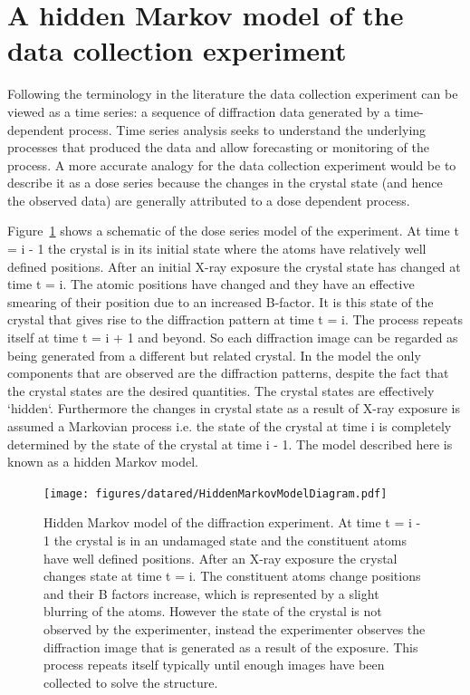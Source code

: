 \section{A hidden Markov model of the data collection experiment}
\label{sec:A hidden Markov model of the data collection experiment}
Following the terminology in the literature the data collection experiment can be viewed as a time series: a sequence of diffraction data generated by a time-dependent process.
Time series analysis seeks to understand the underlying processes that produced the data and allow forecasting or monitoring of the process.
A more accurate analogy for the data collection experiment would be to describe it as a dose series because the changes in the crystal state (and hence the observed data) are generally attributed to a dose dependent process.

Figure~\ref{fig:Hidden Markov Model diagram} shows a schematic of the dose series model of the experiment.
At time t = i - 1 the crystal is in its initial state where the atoms have relatively well defined positions.
After an initial X-ray exposure the crystal state has changed at time t = i.
The atomic positions have changed and they have an effective smearing of their position due to an increased B-factor.
It is this state of the crystal that gives rise to the diffraction pattern at time t = i.
The process repeats itself at time t = i + 1 and beyond.
So each diffraction image can be regarded as being generated from a different but related crystal.
In the model the only components that are observed are the diffraction patterns, despite the fact that the crystal states are the desired quantities.
The crystal states are effectively `hidden`.
Furthermore the changes in crystal state as a result of X-ray exposure is assumed a Markovian process i.e. the state of the crystal at time i is completely determined by the state of the crystal at time i - 1.
The model described here is known as a hidden Markov model.
\begin{figure}[ht!]
    \centering
    \texttt{[image: figures/datared/HiddenMarkovModelDiagram.pdf]}
    \caption{Hidden Markov model of the diffraction experiment.
    At time t = i - 1 the crystal is in an undamaged state and the constituent atoms have well defined positions.
    After an X-ray exposure the crystal changes state at time t = i.
    The constituent atoms change positions and their B factors increase, which is represented by a slight blurring of the atoms.
    However the state of the crystal is not observed by the experimenter, instead the experimenter observes the diffraction image that is generated as a result of the exposure.
    This process repeats itself typically until enough images have been collected to solve the structure.}
    \label{fig:Hidden Markov Model diagram}
\end{figure}

